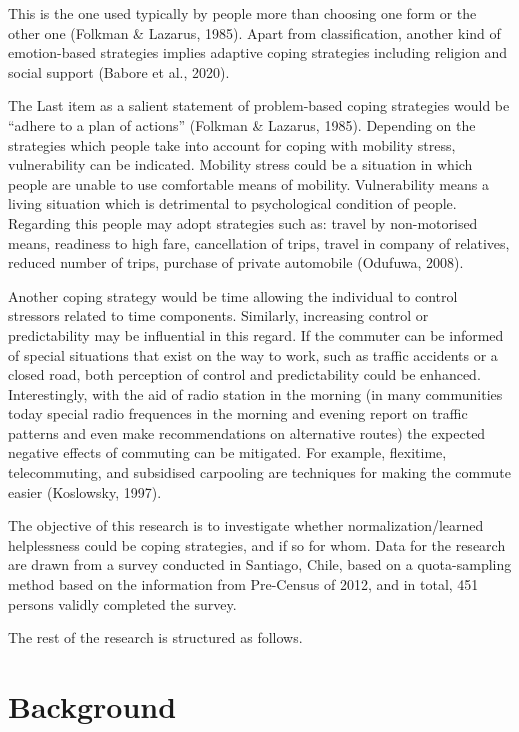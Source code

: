 \documentclass[
11pt, %
oneside, %
english, %
singlespacing, %
]{macthesis} %
\begin{document}
This is the one used typically by people more than choosing one form or the other one (Folkman \& Lazarus, 1985). Apart from classification, another kind of emotion-based strategies implies adaptive coping strategies including religion and social support (Babore et al., 2020).

The Last item as a salient statement of problem-based coping strategies would be ``adhere to a plan of actions'' (Folkman \& Lazarus, 1985). Depending on the strategies which people take into account for coping with mobility stress, vulnerability can be indicated. Mobility stress could be a situation in which people are unable to use comfortable means of mobility. Vulnerability means a living situation which is detrimental to psychological condition of people. Regarding this people may adopt strategies such as: travel by non-motorised means, readiness to high fare, cancellation of trips, travel in company of relatives, reduced number of trips, purchase of private automobile (Odufuwa, 2008).

Another coping strategy would be time allowing the individual to control stressors related to time components. Similarly, increasing control or predictability may be influential in this regard. If the commuter can be informed of special situations that exist on the way to work, such as traffic accidents or a closed road, both perception of control and predictability could be enhanced. Interestingly, with the aid of radio station in the morning (in many communities today special radio frequences in the morning and evening report on traffic patterns and even make recommendations on alternative routes) the expected negative effects of commuting can be mitigated. For example, flexitime, telecommuting, and subsidised carpooling are techniques for making the commute easier (Koslowsky, 1997).

The objective of this research is to investigate whether normalization/learned helplessness could be coping strategies, and if so for whom. Data for the research are drawn from a survey conducted in Santiago, Chile, based on a quota-sampling method based on the information from Pre-Census of 2012, and in total, 451 persons validly completed the survey.

The rest of the research is structured as follows.

\hypertarget{background-1}{%
\section{Background}\label{background-1}}
\end{document}
